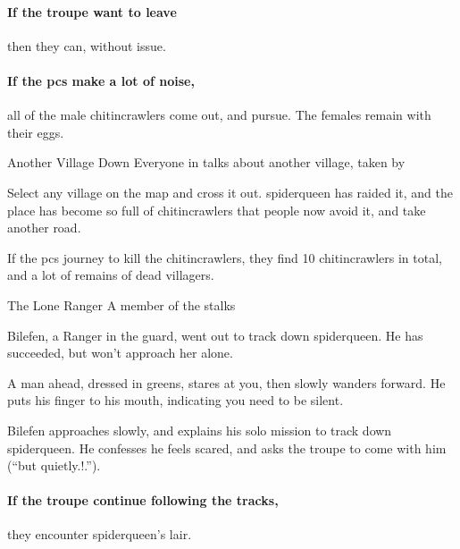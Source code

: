 \paragraph{If the troupe want to leave}
then they can, without issue.

\paragraph{If the \glspl{pc} make a lot of noise,}
all of the male chitincrawlers come out, and pursue.
The females remain with their eggs.



{Another Village Down}%
{Everyone in  talks about another village, taken by }%

Select any village on the map and cross it out.
\Gls{spiderqueen} has raided it, and the place has become so full of chitincrawlers that people now avoid it, and take another road.

If the \glspl{pc} journey to kill the chitincrawlers, they find 10 chitincrawlers in total, and a lot of remains of dead villagers.

{The Lone Ranger}%
{A member of the  stalks }%

Bilefen, a Ranger in the \gls{guard}, went out to track down \gls{spiderqueen}.
He has succeeded, but won't approach her alone.

\begin{boxtext}

  A man ahead, dressed in greens, stares at you, then slowly wanders forward.  He puts his finger to his mouth, indicating you need to be silent.

\end{boxtext}

Bilefen approaches slowly, and explains his solo mission to track down \gls{spiderqueen}.
He confesses he feels scared, and asks the troupe to come with him (``but quietly.!.'').

\paragraph{If the troupe continue following the tracks,}
they encounter \gls{spiderqueen}'s lair.

